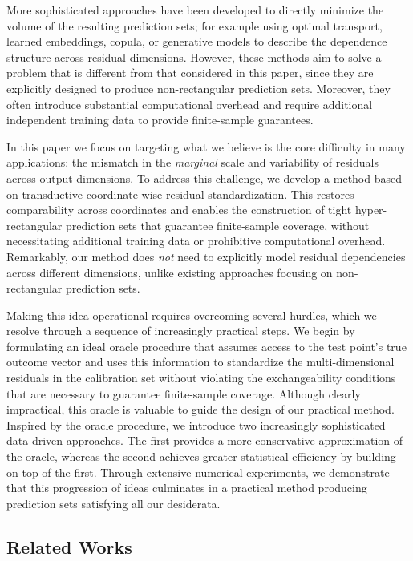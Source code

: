 More sophisticated approaches have been developed to directly minimize the volume of the resulting prediction sets; for example using optimal transport, learned embeddings, copula, or generative models to describe the dependence structure across residual dimensions. However, these methods aim to solve a problem that is different from that considered in this paper, since they are explicitly designed to produce non-rectangular prediction sets. Moreover, they often introduce substantial computational overhead and require additional independent training data to provide finite-sample guarantees.

In this paper we focus on targeting what we believe is the core difficulty in many applications: the mismatch in the {\em marginal} scale and variability of residuals across output dimensions. 
To address this challenge, we develop a method based on transductive coordinate-wise residual standardization. This restores comparability across coordinates and enables the construction of tight hyper-rectangular prediction sets that guarantee finite-sample coverage, without necessitating additional training data or prohibitive computational overhead. Remarkably, our method does {\em not} need to explicitly model residual dependencies across different dimensions, unlike existing approaches focusing on non-rectangular prediction sets.

Making this idea operational requires overcoming several hurdles, which we resolve through a sequence of increasingly practical steps. We begin by formulating an ideal oracle procedure that assumes access to the test point’s true outcome vector and uses this information to standardize the multi-dimensional residuals in the calibration set without violating the exchangeability conditions that are necessary to guarantee finite-sample coverage. Although clearly impractical, this oracle is valuable to guide the design of our practical method.
Inspired by the oracle procedure, we introduce two increasingly sophisticated data-driven approaches. The first provides a more conservative approximation of the oracle, whereas the second achieves greater statistical efficiency by building on top of the first. Through extensive numerical experiments, we demonstrate that this progression of ideas culminates in a practical method producing prediction sets satisfying all our desiderata.


\subsection{Related Works}

